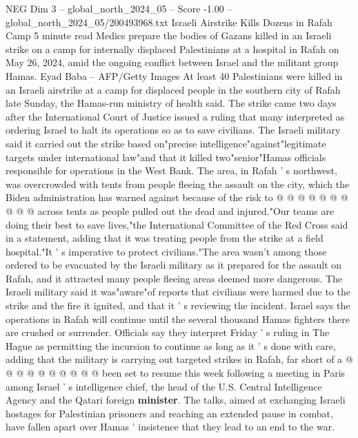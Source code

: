 \begin{textsample}{NEG Dim 3 – global\_north\_2024\_05 – Score -1.00 – global\_north\_2024\_05/200493968.txt}  \label{ex:f3_neg_444}
Israeli Airstrike Kills Dozens in Rafah Camp 5 minute read Medics prepare the bodies of Gazans killed in an Israeli strike on a camp for internally displaced Palestinians at a hospital in Rafah on May 26, 2024, amid the ongoing conflict between Israel and the militant group Hamas.
Eyad Baba -- AFP/Getty Images At least 40 Palestinians were killed in an Israeli airstrike at a camp for displaced people in the southern city of Rafah late Sunday, the Hamas-run ministry of health said.
The strike came two days after the International Court of Justice issued a ruling that many interpreted as ordering Israel to halt its operations so as to save civilians.
The Israeli military said it carried out the strike based on"precise intelligence"against"legitimate targets under international law"and that it killed two"senior"Hamas officials responsible for operations in the West Bank.
The area, in Rafah ' s northwest, was overcrowded with tents from people fleeing the assault on the city, which the Biden administration has warned against because of the risk to @ @ @ @ @ @ @ @ @ @ across tents as people pulled out the dead and injured."Our teams are doing their best to save lives,"the International Committee of the Red Cross said in a statement, adding that it was treating people from the strike at a field hospital."It ' s imperative to protect civilians."The area wasn't among those ordered to be evacuated by the Israeli military as it prepared for the assault on Rafah, and it attracted many people fleeing areas deemed more dangerous.
The Israeli military said it was"aware"of reports that civilians were harmed due to the strike and the fire it ignited, and that it ' s reviewing the incident.
Israel says the operations in Rafah will continue until the several thousand Hamas fighters there are crushed or surrender.
Officials say they interpret Friday ' s ruling in The Hague as permitting the incursion to continue as long as it ' s done with care, adding that the military is carrying out targeted strikes in Rafah, far short of a @ @ @ @ @ @ @ @ @ @ been set to resume this week following a meeting in Paris among Israel ' s intelligence chief, the head of the U.S.
Central Intelligence Agency and the Qatari foreign \textbf{minister}.
The talks, aimed at exchanging Israeli hostages for Palestinian prisoners and reaching an extended pause in combat, have fallen apart over Hamas ' insistence that they lead to an end to the war.

\end{textsample}
